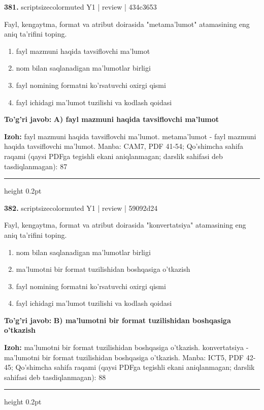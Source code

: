\documentclass[10pt,a4paper]{article}
\begin{document}
{\bfseries\sffamily\color{ink} 381.} {scriptsizecolor{muted} Y1 | review | 434c3653}
\par
Fayl, kengaytma, format va atribut doirasida "metama'lumot" atamasining eng aniq ta'rifini toping.
\begin{enumerate}[label=\Alph*),leftmargin=9mm]
\item fayl mazmuni haqida tavsiflovchi ma'lumot
\item nom bilan saqlanadigan ma'lumotlar birligi
\item fayl nomining formatni ko'rsatuvchi oxirgi qismi
\item fayl ichidagi ma'lumot tuzilishi va kodlash qoidasi
\end{enumerate}
\begin{tcolorbox}[enhanced,breakable,colback=teal!4,colframe=teal!60!black,boxrule=0.45pt,arc=1.2mm,left=2.7mm,right=2.7mm,top=1.8mm,bottom=1.8mm,before skip=2mm,after skip=2mm]
{\bfseries\sffamily\color{teal}To'g'ri javob:} \textbf{A) fayl mazmuni haqida tavsiflovchi ma'lumot}
\par\smallskip
{\bfseries Izoh:} fayl mazmuni haqida tavsiflovchi ma'lumot. metama'lumot - fayl mazmuni haqida tavsiflovchi ma'lumot. Manba: CAM7, PDF 41-54; Qo'shimcha sahifa raqami (qaysi PDFga tegishli ekani aniqlanmagan; darslik sahifasi deb tasdiqlanmagan): 87
\end{tcolorbox}
\vspace{2mm}\hrule height 0.2pt\vspace{3mm}

{\bfseries\sffamily\color{ink} 382.} {scriptsizecolor{muted} Y1 | review | 59092d24}
\par
Fayl, kengaytma, format va atribut doirasida "konvertatsiya" atamasining eng aniq ta'rifini toping.
\begin{enumerate}[label=\Alph*),leftmargin=9mm]
\item nom bilan saqlanadigan ma'lumotlar birligi
\item ma'lumotni bir format tuzilishidan boshqasiga o'tkazish
\item fayl nomining formatni ko'rsatuvchi oxirgi qismi
\item fayl ichidagi ma'lumot tuzilishi va kodlash qoidasi
\end{enumerate}
\begin{tcolorbox}[enhanced,breakable,colback=teal!4,colframe=teal!60!black,boxrule=0.45pt,arc=1.2mm,left=2.7mm,right=2.7mm,top=1.8mm,bottom=1.8mm,before skip=2mm,after skip=2mm]
{\bfseries\sffamily\color{teal}To'g'ri javob:} \textbf{B) ma'lumotni bir format tuzilishidan boshqasiga o'tkazish}
\par\smallskip
{\bfseries Izoh:} ma'lumotni bir format tuzilishidan boshqasiga o'tkazish. konvertatsiya - ma'lumotni bir format tuzilishidan boshqasiga o'tkazish. Manba: ICT5, PDF 42-45; Qo'shimcha sahifa raqami (qaysi PDFga tegishli ekani aniqlanmagan; darslik sahifasi deb tasdiqlanmagan): 88
\end{tcolorbox}
\vspace{2mm}\hrule height 0.2pt\vspace{3mm}
\end{document}
